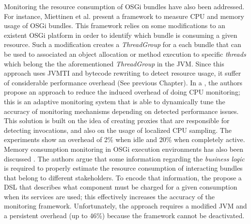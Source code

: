 Monitoring the resource consumption of OSGi bundles have also been addressed.
For instance, Miettinen et al. \cite{Miettinen2008} present a framework to measure CPU and memory usage of OSGi bundles.
This framework relies on some modifications to an existent OSGi platform in order to identify which bundle is consuming a given resource.
Such a modification creates a \textit{ThreadGroup} for a each bundle that can be used to associated an object allocation or method execution to specific \textit{threads} which belong the the aforementioned \textit{ThreadGroup} in the JVM.
Since this approach uses JVMTI and bytecode rewriting to detect resource usage, it suffer of considerable performance overhead (See previous Chapter).
In a \cite{Maurel:2012:AME:2304736.2304763}, the authors propose an approach to reduce the induced overhead of doing CPU monitoring; this is an adaptive monitoring system that is able to dynamically tune the accuracy of monitoring mechanisms depending on detected performance issues.
This solution is built on the idea of creating proxies that are responsible for detecting invocations, and also on the usage of localized CPU sampling.
The experiments show an overhead of 2\% when idle and 20\% when completely active.
Memory consumption monitoring in OSGi execution environments has also been discussed \cite{Attouchi:2014:MMM:2602458.2602467}.
The authors argue that some information regarding the \textit{business logic} is required to properly estimate the resource consumption of interacting bundles that belong to different stakeholders. 
To encode that information, the propose a DSL that describes what component must be charged for a given consumption when its services are used; this effectively increases the accuracy of the monitoring framework.
Unfortunately, the approach requires a modified JVM and a persistent overhead (up to 46\%) because the framework cannot be deactivated.

